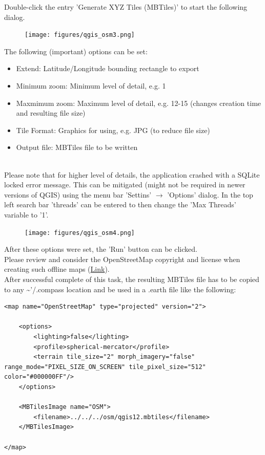 Double-click the entry 'Generate XYZ Tiles (MBTiles)' to start the following dialog.

\begin{figure}[H]
    \texttt{[image: figures/qgis\_osm3.png]}
\end{figure}

The following (important) options can be set:
\begin{itemize}
 \item Extend: Latitude/Longitude bounding rectangle to export
 \item Minimum zoom: Minimum level of detail, e.g. 1
 \item Maxmimum zoom: Maximum level of detail, e.g. 12-15 (changes creation time and resulting file size)
 \item Tile Format: Graphics for using, e.g. JPG (to reduce file size)
 \item Output file: MBTiles file to be written
\end{itemize}
 \ \\

Please note that for higher level of details, the application crashed with a SQLite locked error message. This can be mitigated (might not be required in newer versions of QGIS) using the menu bar 'Settins' $\rightarrow$ 'Options' dialog. In the top left search bar 'threads' can be entered to then change the 'Max Threads' variable to '1'. \\

\begin{figure}[H]
    \texttt{[image: figures/qgis\_osm4.png]}
\end{figure}
 
After these options were set, the 'Run' button can be clicked. \\

Please review and consider the OpenStreetMap copyright and license when creating such offline maps (\href{https://www.openstreetmap.org/copyright}{Link}). \\

After successful complete of this task, the resulting MBTiles file has to be copied to any \textasciitilde'/.compass location and be used in a .earth file like the following:

\begin{lstlisting}
<map name="OpenStreetMap" type="projected" version="2">

    <options>
        <lighting>false</lighting>
        <profile>spherical-mercator</profile>
        <terrain tile_size="2" morph_imagery="false" range_mode="PIXEL_SIZE_ON_SCREEN" tile_pixel_size="512" color="#000000FF"/>
    </options>
    
    <MBTilesImage name="OSM">
        <filename>../../../osm/qgis12.mbtiles</filename>
    </MBTilesImage>
    
</map>
\end{lstlisting}

